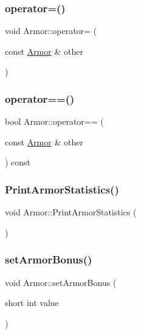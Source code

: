 \subsubsection{\texorpdfstring{operator=()}{operator=()}}
{\footnotesize\ttfamily void Armor\+::operator= (\begin{DoxyParamCaption}\item[{const \mbox{\hyperlink{class_armor}{Armor}} \&}]{other }\end{DoxyParamCaption})}

\mbox{\label{class_armor_a400f558650400d25fc5fc3031a455c46}} 
\subsubsection{\texorpdfstring{operator==()}{operator==()}}
{\footnotesize\ttfamily bool Armor\+::operator== (\begin{DoxyParamCaption}\item[{const \mbox{\hyperlink{class_armor}{Armor}} \&}]{other }\end{DoxyParamCaption}) const}

\mbox{\label{class_armor_a248a63d0d2801a10d6a4039f60b6a0c7}} 
\subsubsection{\texorpdfstring{Print\+Armor\+Statistics()}{PrintArmorStatistics()}}
{\footnotesize\ttfamily void Armor\+::\+Print\+Armor\+Statistics (\begin{DoxyParamCaption}{ }\end{DoxyParamCaption})}

\mbox{\label{class_armor_a14c15f72741f2a3dec28c746b3678c20}} 
\subsubsection{\texorpdfstring{set\+Armor\+Bonus()}{setArmorBonus()}}
{\footnotesize\ttfamily void Armor\+::set\+Armor\+Bonus (\begin{DoxyParamCaption}\item[{short int}]{value }\end{DoxyParamCaption})}


